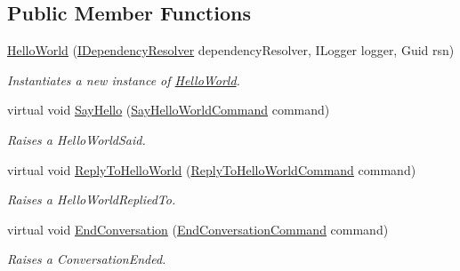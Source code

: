 \subsection*{Public Member Functions}
\begin{DoxyCompactItemize}
\item 
\hyperlink{classCqrs_1_1Akka_1_1Tests_1_1Unit_1_1Aggregates_1_1HelloWorld_a54c9de656ea141ad532d55ba33e94a56_a54c9de656ea141ad532d55ba33e94a56}{Hello\+World} (\hyperlink{interfaceCqrs_1_1Configuration_1_1IDependencyResolver}{I\+Dependency\+Resolver} dependency\+Resolver, I\+Logger logger, Guid rsn)
\begin{DoxyCompactList}\small\item\em Instantiates a new instance of \hyperlink{classCqrs_1_1Akka_1_1Tests_1_1Unit_1_1Aggregates_1_1HelloWorld}{Hello\+World}. \end{DoxyCompactList}\item 
virtual void \hyperlink{classCqrs_1_1Akka_1_1Tests_1_1Unit_1_1Aggregates_1_1HelloWorld_a20af0c54b6a45906cde151ebd20c93a5_a20af0c54b6a45906cde151ebd20c93a5}{Say\+Hello} (\hyperlink{classCqrs_1_1Akka_1_1Tests_1_1Unit_1_1Commands_1_1SayHelloWorldCommand}{Say\+Hello\+World\+Command} command)
\begin{DoxyCompactList}\small\item\em Raises a Hello\+World\+Said. \end{DoxyCompactList}\item 
virtual void \hyperlink{classCqrs_1_1Akka_1_1Tests_1_1Unit_1_1Aggregates_1_1HelloWorld_a6e0f9b4297a292190a605c34741395a5_a6e0f9b4297a292190a605c34741395a5}{Reply\+To\+Hello\+World} (\hyperlink{classCqrs_1_1Akka_1_1Tests_1_1Unit_1_1Commands_1_1ReplyToHelloWorldCommand}{Reply\+To\+Hello\+World\+Command} command)
\begin{DoxyCompactList}\small\item\em Raises a Hello\+World\+Replied\+To. \end{DoxyCompactList}\item 
virtual void \hyperlink{classCqrs_1_1Akka_1_1Tests_1_1Unit_1_1Aggregates_1_1HelloWorld_a310c79f307749813d56872b41c9685f0_a310c79f307749813d56872b41c9685f0}{End\+Conversation} (\hyperlink{classCqrs_1_1Akka_1_1Tests_1_1Unit_1_1Commands_1_1EndConversationCommand}{End\+Conversation\+Command} command)
\begin{DoxyCompactList}\small\item\em Raises a Conversation\+Ended. \end{DoxyCompactList}\item 

\end{DoxyCompactItemize}
